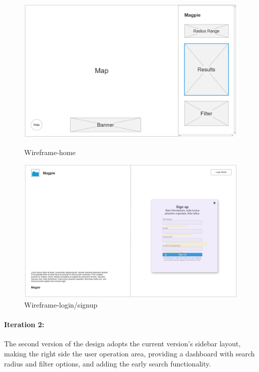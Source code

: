 \begin{figure}[h]
    \centering
    \begin{minipage}{0.48\textwidth}
        \centering
        \includegraphics[width=\textwidth]{images/wireframe-home.jpg}
        \caption{Wireframe-home}
        \label{fig:wireframe-home}
    \end{minipage}
    \hfill
    \begin{minipage}{0.48\textwidth}
        \centering
        \includegraphics[width=\textwidth]{images/wireframe-signup.jpg}
        \caption{Wireframe-login/signup}
        \label{fig:wireframe-signup}
    \end{minipage}
\end{figure}


\paragraph{Iteration 2:}
The second version of the design adopts the current version's sidebar layout, making the right side the user operation area, providing a dashboard with search radius and filter options, and adding the early search functionality.

